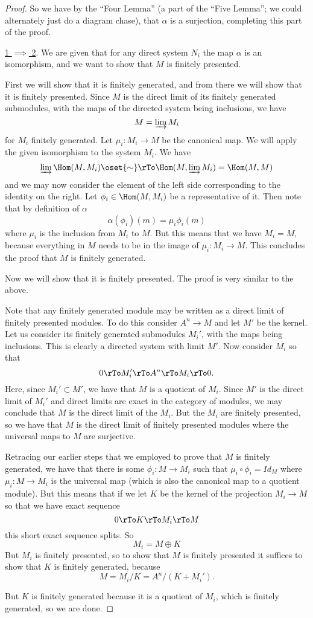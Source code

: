 \documentclass[12 pt]{article}
\theoremstyle{definition}
\begin{document}
\begin{proof}
So we have by the ``Four Lemma'' (a part of the ``Five Lemma''; we could alternately just do a diagram chase), that $\alpha$ is a surjection, completing this part of the proof.



\underline{1 $\implies$ 2}. We are given that for any direct system $N_i$ the map $\alpha$ is an isomorphism, and we want to show that $M$ is finitely presented.

First we will show that it is finitely generated, and from there we will show that it is finitely presented. Since $M$ is the direct limit of its finitely generated submodules, with the maps of the directed system being inclusions, we have
\[M=\varinjlim M_i\]
for $M_i$ finitely generated. Let $\mu_i:M_i \to M$ be the canonical map. We will apply the given isomorphism to the system $M_i$. We have
\[\varinjlim \Hom(M, M_i) \oset{\sim}\rTo \Hom(M, \varinjlim M_i)=\Hom(M,M)\]
and we may now consider the element of the left side corresponding to the identity on the right. Let $\phi_i \in \Hom(M, M_i)$ be a representative of it. Then note that by definition of $\alpha$
\[\alpha(\phi_i)(m)=\mu_i\phi_i(m)\]
where $\mu_i$ is the inclusion from $M_i$ to $M$. But this means that we have $M_i=M$, because everything in $M$ needs to be in the image of $\mu_i:M_i \to M$. This concludes the proof that $M$ is finitely generated.

Now we will show that it is finitely presented. The proof is very similar to the above.

Note that any finitely generated module may be written as a direct limit of finitely presented modules. To do this consider $A^n \to M$ and let $M'$ be the kernel. Let us consider its finitely generated submodules $M_i'$, with the maps being inclusions. This is clearly a directed system with limit $M'$.
Now consider $M_i$ so that
\[0 \rTo M_i' \rTo A^n \rTo M_i \rTo 0.\]
Here, since $M_i' \subset M'$, we have that $M$ is a quotient of $M_i$. Since $M'$ is the direct limit of $M_i'$ and direct limits are exact in the category of modules, we may conclude that $M$ is the direct limit of the $M_i$. But the $M_i$ are finitely presented, so we have that $M$ is the direct limit of finitely presented modules where the universal maps to $M$ are surjective.


Retracing our earlier steps that we employed to prove that $M$ is finitely generated, we have that there is some $\phi_i:M \to M_i$ such that $\mu_i\circ \phi_i=Id_M$ where $\mu_i:M \to M_i$ is the universal map (which is also the canonical map to a quotient module). But this means that if we let $K$ be the kernel of the projection $M_i \to M$ so that we have exact sequence
\[0 \rTo K \rTo M_i \rTo M\]
this short exact sequence splits. So
\[M_i=M \oplus K\]
But $M_i$ is finitely presented, so to show that $M$ is finitely presented it suffices to show that $K$ is finitely generated, because
\[M=M_i/K=A^n/(K+M_i').\]

But $K$ is finitely generated because it is a quotient of $M_i$, which is finitely generated, so we are done.






\end{proof}
\end{document}
